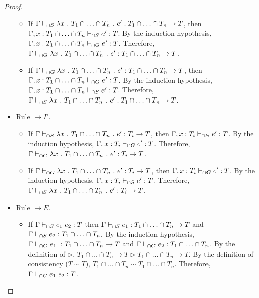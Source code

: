 \documentclass[a4paper]{article}
\begin{document}
\begin{proof}
\begin{itemize}
    \begin{itemize}
        \item If $\Gamma \sits \lambda x\ .\ T_1 \cap \ldots \cap T_n\ .\ e' : T_1 \cap \ldots \cap T_n \rightarrow T$, then $\Gamma, x : T_1 \cap \ldots \cap T_n \vdash_{\cap S} e' : T$.
        By the induction hypothesis, $\Gamma, x : T_1 \cap \ldots \cap T_n \vdash_{\cap G} e' : T$.
        Therefore, $\Gamma \gits \lambda x\ .\ T_1 \cap \ldots \cap T_n\ .\ e' : T_1 \cap \ldots \cap T_n \rightarrow T$.
        \item If $\Gamma \gits \lambda x\ .\ T_1 \cap \ldots \cap T_n\ .\ e' : T_1 \cap \ldots \cap T_n \rightarrow T$, then $\Gamma, x : T_1 \cap \ldots \cap T_n \vdash_{\cap G} e' : T$.
        By the induction hypothesis, $\Gamma, x : T_1 \cap \ldots \cap T_n \vdash_{\cap S} e' : T$.
        Therefore, $\Gamma \sits \lambda x\ .\ T_1 \cap \ldots \cap T_n\ .\ e' : T_1 \cap \ldots \cap T_n \rightarrow T$.
    \end{itemize}
    \item Rule ${\rightarrow} I'$.
    \begin{itemize}
        \item If $\Gamma \vdash_{\cap S} \lambda x\ .\ T_1 \cap \ldots \cap T_n\ .\ e' : T_i \rightarrow T$, then $\Gamma, x : T_i \vdash_{\cap S} e' : T$.
        By the induction hypothesis, $\Gamma, x : T_i \vdash_{\cap G} e' : T$.
        Therefore, $\Gamma \vdash_{\cap G} \lambda x\ .\ T_1 \cap \ldots \cap T_n\ .\ e' : T_i \rightarrow T$.
        \item If $\Gamma \vdash_{\cap G} \lambda x\ .\ T_1 \cap \ldots \cap T_n\ .\ e' : T_i \rightarrow T$, then $\Gamma, x : T_i \vdash_{\cap G} e' : T$.
        By the induction hypothesis, $\Gamma, x : T_i \vdash_{\cap S} e' : T$.
        Therefore, $\Gamma \vdash_{\cap S} \lambda x\ .\ T_1 \cap \ldots \cap T_n\ .\ e' : T_i \rightarrow T$.
    \end{itemize}
    \item Rule ${\rightarrow} E$.
    \begin{itemize}
        \item If $\Gamma \vdash_{\cap S} e_1\ e_2 : T$ then $\Gamma \vdash_{\cap S} e_1 : T_1 \cap \ldots \cap T_n \rightarrow T$ and $\Gamma \vdash_{\cap S} e_2 : T_1 \cap \ldots \cap T_n$.
        By the induction hypothesis, $\Gamma \vdash_{\cap G} e_1\ : T_1 \cap \ldots \cap T_n \rightarrow T$ and $\Gamma \vdash_{\cap G} e_2 : T_1 \cap \ldots \cap T_n$.
        By the definition of $\rhd$, $T_1 \cap \ldots \cap T_n \rightarrow T \rhd T_1 \cap \ldots \cap T_n \rightarrow T$.
        By the definition of consistency ($T \sim T$), $T_1 \cap \ldots \cap T_n \sim T_1 \cap \ldots \cap T_n$.
        Therefore, $\Gamma \vdash_{\cap G} e_1\ e_2 : T$.

\end{itemize}
\end{itemize}
\end{proof}
\end{document}
